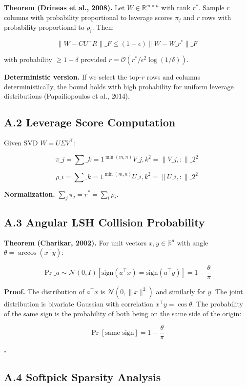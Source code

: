 \textbf{Theorem (Drineas et al., 2008).} Let $W \in \mathbb{R}^{m \times n}$ with 
rank $r^*$. Sample $r$ columns with probability proportional to leverage 
scores $\pi_j$ and $r$ rows with probability proportional to $\rho_i$. Then:

\[
\|W - C U^+ R\|\_F \leq (1 + \epsilon) \|W - W\_{r^*}\|\_F
\tag{A.1}
\]

with probability $\geq 1 - \delta$ provided $r = \mathcal{O}(r^* / \epsilon^2 \log(1/\delta))$.

\textbf{Deterministic version.} If we select the top-$r$ rows and columns 
deterministically, the bound holds with high probability for uniform 
leverage distributions (Papailiopoulos et al., 2014).

\subsection{A.2 Leverage Score Computation}

Given SVD $W = U \Sigma V^\top$:

\[
\pi\_j = \sum\_{k=1}^{\min(m, n)} V\_{j, k}^2 = \|V\_{j, :}\|\_2^2
\tag{A.2}
\]

\[
\rho\_i = \sum\_{k=1}^{\min(m, n)} U\_{i, k}^2 = \|U\_{i, :}\|\_2^2
\tag{A.3}
\]

\textbf{Normalization.} $\sum_j \pi_j = r^* = \sum_i \rho_i$.

\subsection{A.3 Angular LSH Collision Probability}

\textbf{Theorem (Charikar, 2002).} For unit vectors $x, y \in \mathbb{R}^d$ with 
angle $\theta = \arccos(x^\top y)$:

\[
\Pr\_{a \sim \mathcal{N}(0, I)}[\text{sign}(a^\top x) = \text{sign}(a^\top y)] = 1 - \frac{\theta}{\pi}
\tag{A.4}
\]

\textbf{Proof.} The distribution of $a^\top x$ is $\mathcal{N}(0, \|x\|^2)$ and 
similarly for $y$. The joint distribution is bivariate Gaussian with 
correlation $x^\top y = \cos \theta$. The probability of the same sign is 
the probability of both being on the same side of the origin:

\[
\Pr[\text{same sign}] = 1 - \frac{\theta}{\pi}
\]

$\square$

\subsection{A.4 Softpick Sparsity Analysis}

